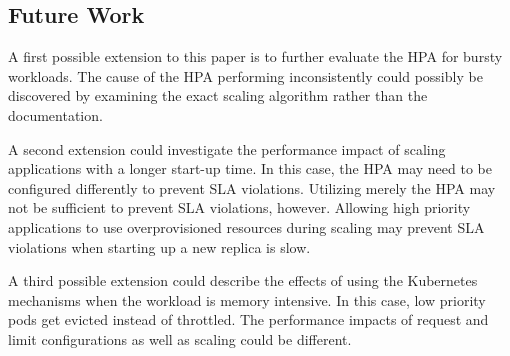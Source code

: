\subsection{Future Work}
A first possible extension to this paper is to further evaluate the HPA for bursty workloads. The cause of the HPA performing inconsistently could possibly be discovered by examining the exact scaling algorithm rather than the documentation. 

A second extension could investigate the performance impact of scaling applications with a longer start-up time. In this case, the HPA may need to be configured differently to prevent SLA violations. Utilizing merely the HPA may not be sufficient to prevent SLA violations, however. Allowing high priority applications to use overprovisioned resources during scaling may prevent SLA violations when starting up a new replica is slow.

A third possible extension could describe the effects of using the Kubernetes mechanisms when the workload is memory intensive. In this case, low priority pods get evicted instead of throttled. The performance impacts of request and limit configurations as well as scaling could be different. 

